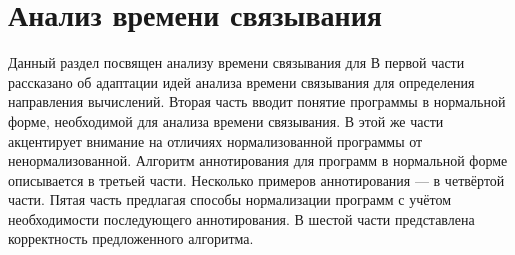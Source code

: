 \section{Анализ времени связывания}
\label{annotator}

Данный раздел посвящен анализу времени связывания для \miniKanren{}
В первой части рассказано об адаптации идей анализа времени связывания для определения направления вычислений.
Вторая часть вводит понятие программы в нормальной форме, необходимой для анализа времени связывания.
В этой же части акцентирует внимание на отличиях нормализованной программы от ненормализованной.
Алгоритм аннотирования для программ в нормальной форме описывается в третьей части.
Несколько примеров аннотирования --- в четвёртой части.
Пятая часть предлагая способы нормализации программ с учётом необходимости последующего аннотирования.
В шестой части представлена корректность предложенного алгоритма.







